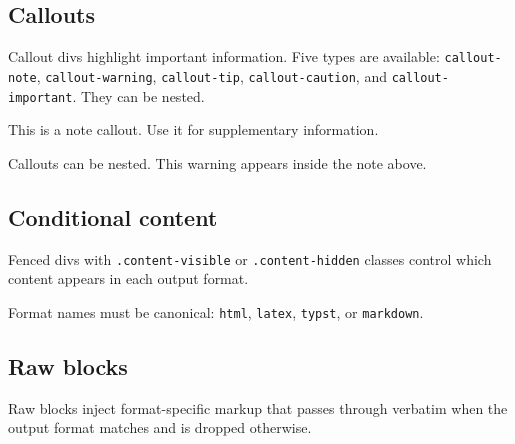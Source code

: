 \subsection{Callouts}
\label{callouts}

Callout divs highlight important information. Five types are available: \texttt{callout-note}, \texttt{callout-warning}, \texttt{callout-tip}, \texttt{callout-caution}, and \texttt{callout-important}. They can be nested.




\begin{tcolorbox}[enhanced, breakable, colback=blue!5, colframe=blue!40,
  left=4pt, right=4pt, top=4pt, bottom=4pt,
  boxrule=0pt, leftrule=3pt, arc=0pt, outer arc=0pt,
  title=Note, fonttitle=\bfseries]
This is a note callout. Use it for supplementary information.




\begin{tcolorbox}[enhanced, breakable, colback=yellow!10, colframe=yellow!60!black,
  left=4pt, right=4pt, top=4pt, bottom=4pt,
  boxrule=0pt, leftrule=3pt, arc=0pt, outer arc=0pt,
  title=Warning, fonttitle=\bfseries]
Callouts can be nested. This warning appears inside the note above.



\end{tcolorbox}

\end{tcolorbox}

\subsection{Conditional content}
\label{conditional-content}

Fenced divs with \texttt{.content-visible} or \texttt{.content-hidden} classes control which content appears in each output format.



Format names must be canonical: \texttt{html}, \texttt{latex}, \texttt{typst}, or \texttt{markdown}.

\subsection{Raw blocks}
\label{raw-blocks}

Raw blocks inject format-specific markup that passes through verbatim when the output format matches and is dropped otherwise.



